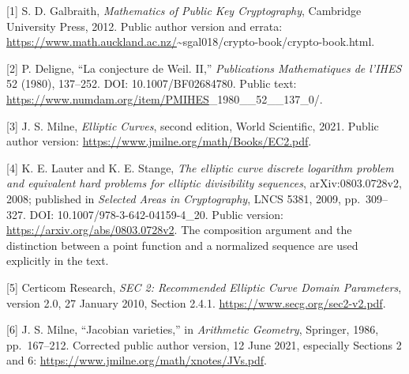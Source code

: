 \documentclass[
  11pt,
  a4paper,
]{article}
\begin{document}
{[}1{]} S. D. Galbraith, \emph{Mathematics of Public Key Cryptography},
Cambridge University Press, 2012. Public author version and errata:
\url{https://www.math.auckland.ac.nz/}\textasciitilde sgal018/crypto-book/crypto-book.html.

{[}2{]} P. Deligne, ``La conjecture de Weil. II,'' \emph{Publications
Mathematiques de l'IHES} 52 (1980), 137--252. DOI: 10.1007/BF02684780.
Public text: \url{https://www.numdam.org/item/PMIHES}\_1980\_\_52\_\_137\_0/.

{[}3{]} J. S. Milne, \emph{Elliptic Curves}, second edition, World
Scientific, 2021. Public author version:
\url{https://www.jmilne.org/math/Books/EC2.pdf}.

{[}4{]} K. E. Lauter and K. E. Stange, \emph{The elliptic curve discrete
logarithm problem and equivalent hard problems for elliptic divisibility
sequences}, arXiv:0803.0728v2, 2008; published in \emph{Selected Areas
in Cryptography}, LNCS 5381, 2009, pp.~309--327. DOI:
10.1007/978-3-642-04159-4\_20. Public version:
\url{https://arxiv.org/abs/0803.0728v2}. The composition argument and the
distinction between a point function and a normalized sequence are used
explicitly in the text.

{[}5{]} Certicom Research, \emph{SEC 2: Recommended Elliptic Curve
Domain Parameters}, version 2.0, 27 January 2010, Section 2.4.1.
\url{https://www.secg.org/sec2-v2.pdf}.

{[}6{]} J. S. Milne, ``Jacobian varieties,'' in \emph{Arithmetic
Geometry}, Springer, 1986, pp.~167--212. Corrected public author
version, 12 June 2021, especially Sections 2 and 6:
\url{https://www.jmilne.org/math/xnotes/JVs.pdf}.
\end{document}
